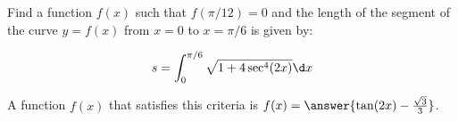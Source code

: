 \documentclass{ximera}
\author{Jim Talamo}
\begin{document}
\begin{exercise}

Find a function $f(x)$ such that $f(\pi/12)=0$ and the length of the segment of the curve $y=f(x)$ from $x=0$ to $x=\pi/6$ is given by:

\[
s= \int_0^{\pi/6} \sqrt{1+4\sec^4(2x)} \d x
\]

A function $f(x)$ that satisfies this criteria is $f(x) = \answer{\tan(2x)-\frac{\sqrt{3}}{3}}$.

\end{exercise}
\end{document}
